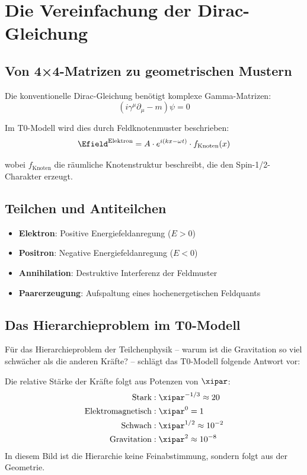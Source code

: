 	\section{Die Vereinfachung der Dirac-Gleichung}
	
	\subsection{Von 4×4-Matrizen zu geometrischen Mustern}
	
	Die konventionelle Dirac-Gleichung benötigt komplexe Gamma-Matrizen:
	\begin{equation}
		(i\gamma^\mu \partial_\mu - m)\psi = 0
	\end{equation}
	
	Im T0-Modell wird dies durch Feldknotenmuster beschrieben:
	\begin{equation}
		\Efield^{\text{Elektron}} = A \cdot e^{i(kx - \omega t)} \cdot f_{\text{Knoten}}(x)
	\end{equation}
	
	wobei $f_{\text{Knoten}}$ die räumliche Knotenstruktur beschreibt, die den Spin-1/2-Charakter erzeugt.
	
	\subsection{Teilchen und Antiteilchen}
	
	\begin{itemize}
		\item \textbf{Elektron}: Positive Energiefeldanregung ($E > 0$)
		\item \textbf{Positron}: Negative Energiefeldanregung ($E < 0$)
		\item \textbf{Annihilation}: Destruktive Interferenz der Feldmuster
		\item \textbf{Paarerzeugung}: Aufspaltung eines hochenergetischen Feldquants
	\end{itemize}
	
	\subsection{Das Hierarchieproblem im T0-Modell}
	
	Für das Hierarchieproblem der Teilchenphysik -- warum ist die Gravitation so viel schwächer als die anderen Kräfte? -- schlägt das T0-Modell folgende Antwort vor:
	
	\begin{important}
		Die relative Stärke der Kräfte folgt aus Potenzen von $\xipar$:
		\begin{align}
			\text{Stark} &: \xipar^{-1/3} \approx 20 \\
			\text{Elektromagnetisch} &: \xipar^0 = 1 \\
			\text{Schwach} &: \xipar^{1/2} \approx 10^{-2} \\
			\text{Gravitation} &: \xipar^2 \approx 10^{-8}
			\end{align}
		In diesem Bild ist die Hierarchie keine Feinabstimmung, sondern folgt aus der Geometrie.
	\end{important}
	
